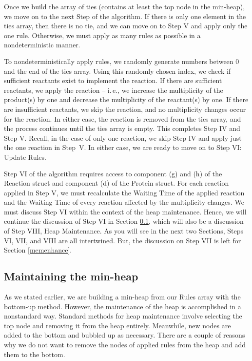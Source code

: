 \documentclass[copyright]{eptcs}
\begin{document}
Once we build the array of ties (contains at least the top node in the min-heap), we move on to the next Step of the algorithm.  If there is only one element in the ties array, then there is no tie, and we can move on to Step V and apply only the one rule.  Otherwise, we must apply as many rules as possible in a nondeterministic manner.

To nondeterministically apply rules, we randomly generate numbers between 0 and the end of 
the ties array.  Using this randomly chosen index, we check if sufficient reactants exist 
to implement the reaction.  If there are sufficient reactants, we apply the 
reaction -- i.\,e., we increase the multiplicity of the product(s) by one and decrease the 
multiplicity of the reactant(s) by one.  If there are insufficient reactants, we skip the 
reaction, and no multiplicity changes occur for the reaction.  In either case, the reaction 
is removed from the ties array, and the process continues until the ties array is empty.  
This completes Step IV and Step V. Recall, in the case of only one reaction, we skip Step IV 
and apply just the one reaction in Step~V.  In either case, we are ready to move on to 
Step VI: Update Rules.


Step VI of the algorithm requires access to component (g) and (h) of the Reaction struct and 
component (d) of the Protein struct.  For each reaction applied in Step V, we must 
recalculate the Waiting Time of the applied reaction and the Waiting Time of every reaction
affected by the multiplicity changes.  We must discuss Step VI within the context of the 
heap maintenance.  Hence, we will continue the discussion of Step VI in 
Section \ref{heapmain}, which will also be a discussion of Step VIII, Heap Maintenance.  
As you will see in the next two Sections, Steps VI, VII, and VIII are all intertwined.  
But, the discussion on Step VII is left for Section \ref{memenhance}.

\subsection{Maintaining the min-heap}\label{heapmain}

As we stated earlier, we are building a min-heap from our Rules array with the bottom-up method.  However, the maintenance of the heap is accomplished in a nonstandard way.  Standard methods for heap maintenance  involve selecting the top node and removing it from the heap entirely.  Meanwhile, new nodes are added to the bottom and bubbled up as necessary.  There are a couple of reasons why we do not want to remove the nodes of applied rules from the heap and add them to the bottom.
\end{document}
